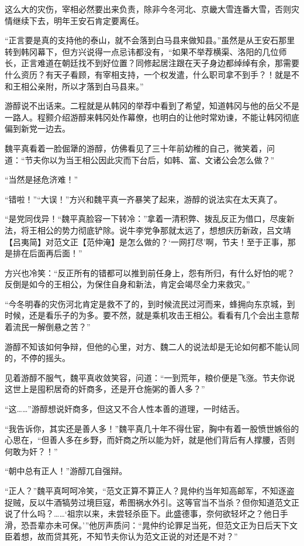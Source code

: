 这么大的灾伤，宰相必然要出来负责，除非今冬河北、京畿大雪连番大雪，否则灾情继续下去，明年王安石肯定要离任。

“正言要是真的支持他的泰山，就不会落到白马县来做知县。”虽然是从王安石那里转到韩冈幕下，但方兴说得一点忌讳都没有，“如果不举荐横渠、洛阳的几位师长，正言难道在朝廷找不到好位置？同修起居注跟在天子身边都绰绰有余，那需要什么资历？有天子看顾，有宰相支持，一个权发遣，什么职司拿不到手？！就是不和王相公亲附，所以才落到白马县来。”

游醇说不出话来。二程就是从韩冈的举荐中看到了希望，知道韩冈与他的岳父不是一路人。程颢介绍游醇来韩冈处作幕僚，也明白的让他时常劝谏，不能让韩冈彻底偏到新党一边去。

魏平真看着一脸倔犟的游醇，仿佛看见了三十年前幼稚的自己，微笑着，问道：“节夫你以为当王相公因此灾而下台后，如韩、富、文诸公会怎么做？”

“当然是拯危济难！”

“错啦！”“大误！”方兴和魏平真一齐暴笑了起来，游醇的说法实在太天真了。

“是党同伐异！“魏平真脸容一下转冷：”拿着一清积弊、拨乱反正为借口，尽废新法，将王相公的势力彻底铲除。说牛李党争那就太远了，想想庆历新政，吕文靖【吕夷简】对范文正【范仲淹】是怎么做的？‘一网打尽’啊，节夫！至于正事，那是排在后面再后面！”

方兴也冷笑：“反正所有的错都可以推到前任身上，怨有所归，有什么好怕的呢？反倒是如今的王相公，为保住自身和新法，肯定会竭尽全力来救灾。”

“今冬明春的灾伤河北肯定是救不了的，到时候流民过河而来，蜂拥向东京城，到时候，还是看乐子的为多。要不然，就是乘机攻击王相公。看看有几个会出主意帮着流民一解倒悬之苦？”

游醇不知该如何争辩，但他的心里，对方、魏二人的说法却是无论如何都不能认同的，不停的摇头。

见着游醇不服气，魏平真收敛笑容，问道：“一到荒年，粮价便是飞涨。节夫你说这世上是囤积居奇的奸商多，还是开仓施粥的善人多？”

“这……”游醇想说奸商多，但这又不合人性本善的道理，一时结舌。

“我告诉你，其实还是善人多！”魏平真几十年不得仕宦，胸中有着一股愤世嫉俗的心思在，“但善人多在乡野，而奸商之所以能为奸，就是他们背后有人撑腰，否则何敢为奸？！”

“朝中总有正人！”游醇兀自强辩。

“正人？”魏平真呵呵冷笑，“范文正算不算正人？晁仲约当年知高邮军，不知逐盗捉贼，反以牛酒犒劳过境巨寇，希图祸水外引。这等官当不当杀？但你知道范文正说了什么吗？……‘祖宗以来，未尝轻杀臣下。此盛德事，奈何欲轻坏之？他日手滑，恐吾辈亦未可保。’”他厉声质问：“晁仲约论罪足当死，但范文正为日后天下文臣着想，故而贷其死，不知节夫你认为范文正说的对还是不对？”

